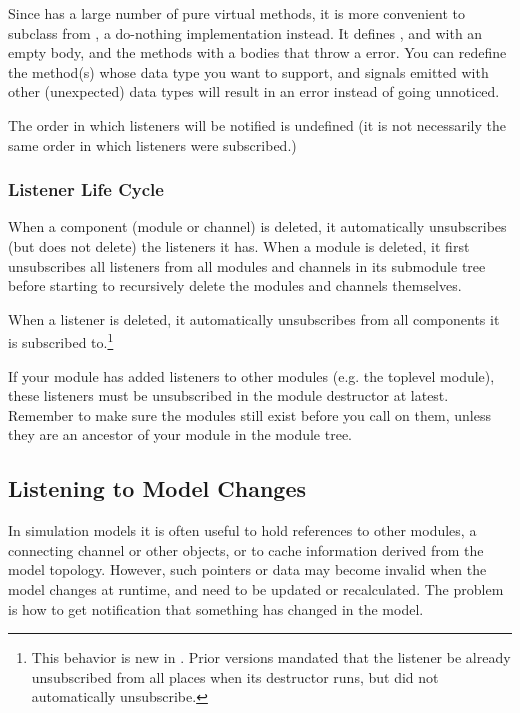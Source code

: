 \begin{ned}
Since  has a large number of pure virtual methods, it is more
convenient to subclass from , a do-nothing implementation
instead. It defines ,  and
 with an empty body, and the 
methods with a bodies that throw a  error.
You can redefine the  method(s) whose data type
you want to support, and signals emitted with other (unexpected) data
types will result in an error instead of going unnoticed.

The order in which listeners will be notified is undefined (it is not necessarily
the same order in which listeners were subscribed.)

\subsubsection{Listener Life Cycle}
\label{sec:simple-modules:signals:life-cycle}

When a component (module or channel) is deleted, it automatically
unsubscribes (but does not delete) the listeners it has. When a
module is deleted, it first unsubscribes all listeners from all
modules and channels in its submodule tree before starting
to recursively delete the modules and channels themselves.

When a listener is deleted, it automatically unsubscribes from all components
it is subscribed to.\footnote{This behavior is new in {}. Prior versions
mandated that the listener be already unsubscribed from all places when its
destructor runs, but did not automatically unsubscribe.}

\begin{note}
  If your module has added listeners to other modules (e.g. the toplevel
  module), these listeners must be unsubscribed in the module
  destructor at latest. Remember to make sure the modules still exist before you
  call  on them, unless they are an ancestor
  of your module in the module tree.
\end{note}


\subsection{Listening to Model Changes}
\label{sec:simple-modules:model-change}

In simulation models it is often useful to hold references to other
modules, a connecting channel or other objects, or to cache information
derived from the model topology. However, such pointers or data may
become invalid when the model changes at runtime, and need to be updated
or recalculated. The problem is how to get notification that something has
changed in the model.


\end{ned}
